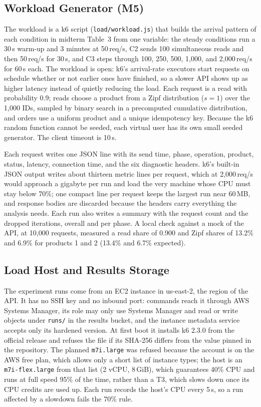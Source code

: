 \documentclass[10pt]{article}
\begin{document}
\subsection{Workload Generator (M5)}
The workload is a k6 script (\texttt{load/workload.js}) that builds the
arrival pattern of each condition in midterm Table~3 from one variable: the steady
conditions run a 30\,s warm-up and 3 minutes at 50\,req/s, C2 sends 100
simultaneous reads and then 50\,req/s for 30\,s, and C3 steps through 100, 250,
500, 1{,}000, and 2{,}000\,req/s for 60\,s each. The workload is open: k6's
arrival-rate executors start requests on schedule whether or not earlier ones
have finished, so a slower API shows up as higher latency instead of quietly
reducing the load. Each request is a read with probability 0.9; reads choose a
product from a Zipf distribution ($s = 1$) over the 1{,}000 IDs, sampled by
binary search in a precomputed cumulative distribution, and orders use a
uniform product and a unique idempotency key. Because the k6 random function
cannot be seeded, each virtual user has its own small seeded generator. The
client timeout is 10\,s.

Each request writes one JSON line with its send time, phase, operation,
product, status, latency, connection time, and the six diagnostic headers.
k6's built-in JSON output writes about thirteen metric lines per request,
which at 2{,}000\,req/s would approach a gigabyte per run and load the very
machine whose CPU must stay below 70\%; one compact line per request keeps
the largest run near 60\,MB, and response bodies are discarded because the
headers carry everything the analysis needs. Each run also writes a summary
with the request count and the dropped iterations, overall and per phase. A
local check against a mock of the API, at 10{,}000 requests, measured a read
share of 0.900 and Zipf shares of 13.2\% and 6.9\% for products 1 and 2
(13.4\% and 6.7\% expected).

\subsection{Load Host and Results Storage}
The experiment runs come from an EC2 instance in us-east-2, the region of the
API. It has no SSH key and no inbound port: commands reach it through AWS
Systems Manager, its role may only use Systems Manager and read or write
objects under \texttt{runs/} in the results bucket, and the instance metadata
service accepts only its hardened version. At first boot it installs k6 2.3.0
from the official release and refuses the file if its SHA-256 differs from
the value pinned in the repository. The planned \texttt{m7i.large} was
refused because the account is on the AWS free plan, which allows only a short
list of instance types; the host is an \texttt{m7i-flex.large} from that list
(2 vCPU, 8\,GiB), which guarantees 40\% CPU and runs at full speed 95\% of the
time, rather than a T3, which slows down once its CPU credits are used up.
Each run records the host's CPU every 5\,s, so a run affected by a slowdown
fails the 70\% rule.
\end{document}
